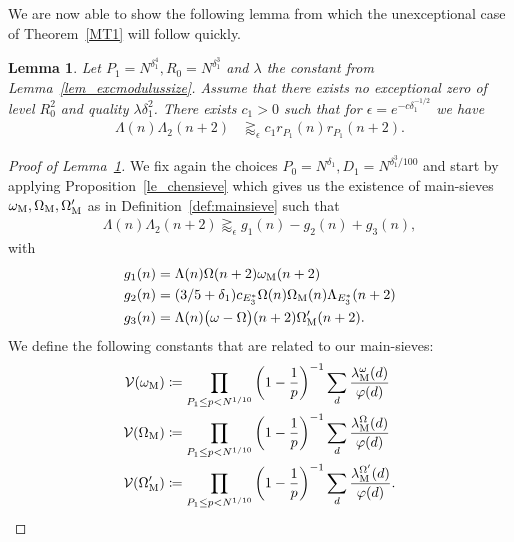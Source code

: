 \documentclass[12pt]{amsart}
\newtheorem{lemma}[theorem]{Lemma}
\theoremstyle{definition}
\theoremstyle{remark}
\numberwithin{equation}{section}
\newcommand{\1}{\mathbf{1}}
\begin{document}
     We are now able to show the following lemma from which the unexceptional case of Theorem~\ref{MT1} will follow quickly. 
	\begin{lemma}\label{lem_finalunex}
    Let $P_1=N^{\delta_1^4},R_0=N^{\delta_1^3}$ and $\lambda$ the constant from Lemma~\ref{lem_excmodulussize}.
		Assume that there exists no exceptional zero of level $R_0^2$ and quality $\lambda\delta_1^2$. There exists $c_1>0$ such that for $\epsilon = e^{-c \delta_1^{-1/2}}$ we have 
			\begin{align}
				\label{eq_lem_finalunex_1} \Lambda(n)\Lambda_2(n+2)&\gtrapprox_{\epsilon} c_1  r_{P_1}(n)r_{P_1}(n+2).
			\end{align}
		\end{lemma}
		
		
		\begin{proof}[Proof of Lemma~\ref{lem_finalunex}]
        We fix again the choices $P_0=N^{\delta_1},D_1=N^{\delta_1^3/100}$ and start by applying Proposition~\ref{le_chensieve} which gives us the existence of main-sieves $\omega_{\textup{M}},\Omega_{\textup{M}},\Omega'_{\textup{M}}$ as in Definition~\ref{def:mainsieve} such that
        \begin{align}\label{eq:finalunex1}
            \Lambda(n)\Lambda_2(n+2) \gtrapprox_{\epsilon} g_1(n)-g_2(n)+g_3(n),
        \end{align}
        with 
        \begin{align*}
            g_1(n)&=\Lambda(n)\Omega(n+2)\omega_{\textnormal{M}}(n+2)\\
    g_2(n)&=(3/5+\delta_1)c_{E_3^*}\Omega(n)\Omega_{\textnormal{M}}(n)\Lambda_{E_3^*}(n+2)\\
    g_3(n)&=\Lambda(n)\bigl(\omega -\Omega\bigr)(n+2)\Omega'_{\textnormal{M}}(n+2).
        \end{align*}
        We define the following constants that are related to our main-sieves: 
		\begin{align*}
        \mathcal{V}(\omega_{\textup{M}})&\coloneqq\prod_{P_1\leq p < N^{1/10}}\left(1-\frac{1}{p}\right)^{-1} \sum_{d}\frac{\lambda^\omega_{\textup{M}}(d)}{\varphi(d)}\\
        \mathcal{V}(\Omega_{\textup{M}})&\coloneqq\prod_{P_1\leq p < N^{1/10}}\left(1-\frac{1}{p}\right)^{-1} \sum_{d}\frac{\lambda^\Omega_{\textup{M}}(d)}{\varphi(d)}\\
        \mathcal{V}(\Omega'_{\textup{M}})&\coloneqq\prod_{P_1\leq p < N^{1/10}}\left(1-\frac{1}{p}\right)^{-1} \sum_{d}\frac{\lambda^{\Omega'}_{\textup{M}}(d)}{\varphi(d)}.

\end{align*}
\end{proof}
\end{document}

